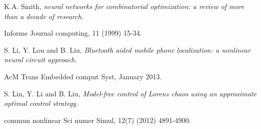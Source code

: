 \documentclass[final,5p,times]{elsarticle}
\begin{document}



 



\begin{thebibliography}{00}


K.A. Smith, {\it neural networks for combinatorial optimization: a review of more than a decade of research.}

Informs Journal computing, 11 (1999) 15-34.


S. Li, Y. Lou and B. Liu, {\it Bluetooth aided mobile phone localization: a nonlinear neural circuit approach.}

AcM Trans Embedded comput Syst, January 2013.


S. Lin, Y. Li and B. Liu, {\it Model-free control of Lorenz chaos using an approximate optimal control strategy.}

commun nonlinear Sci numer Simul, 12(7) (2012) 4891-4900.

\end{thebibliography}
\end{document}
